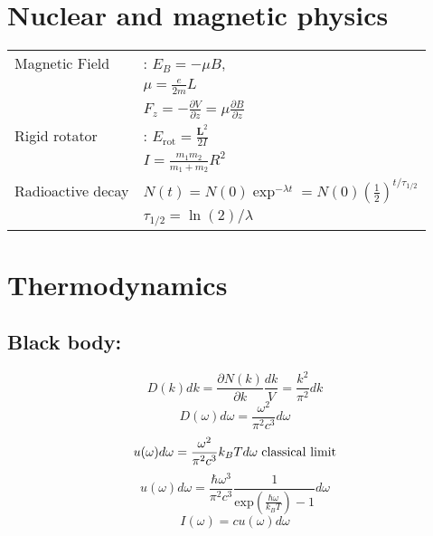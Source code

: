 \documentclass[12pt,a4paper]{article}
\begin{document}
	
	\section*{Nuclear and magnetic physics}
	\begin{tabular}{ll}
		{Magnetic Field} & : \(E_B = - \mu B \), \\
		& \( \mu = \frac{e}{2m} L\)\\
		& \( F_z = - \frac{\partial V}{\partial z} = \mu \frac{\partial B}{\partial z}  \)\\
		{Rigid rotator} & : \(E_\text{rot} = \frac{\textbf{L}^2}{2I}\) \\
		& \( I = \frac{m_1 m_2 }{m_1 + m_2} R^2 \) \\
		{Radioactive decay} & \( N(t) = N(0) \exp ^ {-\lambda t} = N(0) (\frac{1}{2})^{t/\tau _{1/2}}\)\\
		& \( \tau _{1/2} = \ln (2) / \lambda\)\\
	\end{tabular}
	
	\section*{Thermodynamics}
	\subsection*{Black body:}
	\begin{equation*}
		D(k) dk = \frac{\partial N(k)}{\partial k} \frac{dk}{V} = \frac{k^2}{\pi^2} dk
	\end{equation*}
	\begin{equation*}
		D(\omega) d\omega = \frac{\omega^2}{\pi^2 c^3} d\omega
	\end{equation*}
	\begin{equation*}
		u(\omega) d\omega = \frac{\omega^2}{\pi^2 c^3} k_B T d\omega \hspace*{3pt}\text{classical limit}
	\end{equation*}
		\begin{equation*}
		u(\omega) d\omega = \frac{\hbar \omega^3}{\pi^2 c^3} \frac{1}{\text{exp}(\frac{\hbar \omega}{k_B T})-1} d\omega
	\end{equation*}
	\begin{equation*}
		I(\omega) = c u(\omega) d\omega
	\end{equation*}
	
	
	
\end{document}
